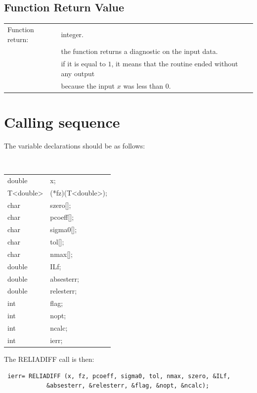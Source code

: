 \documentclass[10pt]{article}
\begin{document}
\subsection{Function Return Value}

\begin{center}

\begin{longtable}{ll}
Function return:&	integer.\\
&the function returns a diagnostic on the input data.\\
&if it is equal to $1$, it means that the routine ended without any output\\
& because the input $x$ was less than $0$.

 \end{longtable} \end{center}







\section{Calling sequence}

The variable declarations should be as follows:

\begin{center}
{\tt
\begin{tabular}{ll}
	double	&	x;	\\
	T<double>&	(*fz)(T<double>);\\
	char      &	szero[]; 	\\
	char	&	pcoeff[];	\\
	char	&	sigma0[];    \\
	char 	&	tol[];		\\
	char	&	nmax[]; \\
	double 	&ILf;		\\
	double	&	absesterr;\\
	double	&	relesterr;\\
	int	&	flag;	\\
	int	&	nopt;\\
	int	&	ncalc;	\\
	int	&	ierr;
\end{tabular}
}
\end{center}


The RELIADIFF call is then:

\begin{center}
\begin{verbatim}
 ierr= RELIADIFF (x, fz, pcoeff, sigma0, tol, nmax, szero, &ILf,
			&absesterr, &relesterr, &flag, &nopt, &ncalc);
\end{verbatim}
\end{center}
\end{document}

